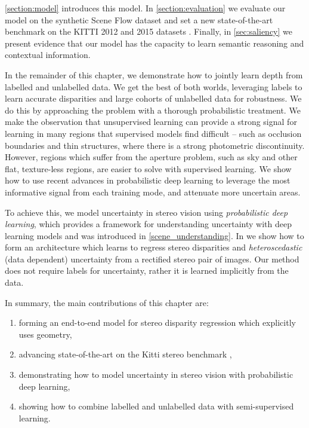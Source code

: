\cref{section:model} introduces this model. In \cref{section:evaluation} we evaluate our model on the synthetic Scene Flow dataset \citep{MIFDB16} and set a new state-of-the-art benchmark on the KITTI 2012 and 2015 datasets \citep{Geiger2012CVPR,Menze2015CVPR}. Finally, in \cref{sec:saliency} we present evidence that our model has the capacity to learn semantic reasoning and contextual information.


In the remainder of this chapter, we demonstrate how to jointly learn depth from labelled and unlabelled data. We get the best of both worlds, leveraging labels to learn accurate disparities and large cohorts of unlabelled data for robustness. We do this by approaching the problem with a thorough probabilistic treatment. We make the observation that unsupervised learning can provide a strong signal for learning in many regions that supervised models find difficult -- such as occlusion boundaries and thin structures, where there is a strong photometric discontinuity. However, regions which suffer from the aperture problem, such as sky and other flat, texture-less regions, are easier to solve with supervised learning. We show how to use recent advances in probabilistic deep learning to leverage the most informative signal from each training mode, and attenuate more uncertain areas.

To achieve this, we model uncertainty in stereo vision using \textit{probabilistic deep learning}, which provides a framework for understanding uncertainty with deep learning models \citep{kendall2017uncertainties,gal2016thesis} and was introduced in \cref{scene_understanding}. In  we show how to form an architecture which learns to regress stereo disparities and \textit{heteroscedastic} (data dependent) uncertainty \citep{der2009aleatory} from a rectified stereo pair of images. Our method does not require labels for uncertainty, rather it is learned implicitly from the data.

In summary, the main contributions of this chapter are:
\begin{enumerate}
\item forming an end-to-end model for stereo disparity regression which explicitly uses geometry,
\item advancing state-of-the-art on the Kitti stereo benchmark \citep{Geiger2012CVPR},
\item demonstrating how to model uncertainty in stereo vision with probabilistic deep learning,
\item showing how to combine labelled and unlabelled data with semi-supervised learning.
\end{enumerate}

